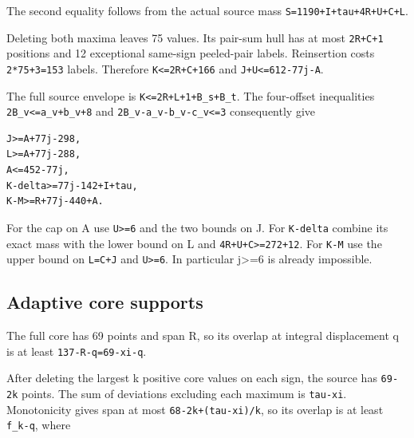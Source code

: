 \documentclass[10pt,a4paper]{article}
\theoremstyle{definition}
\begin{document}
The second equality follows from the actual source mass
\texttt{S=\allowbreak{}1190+\allowbreak{}I+\allowbreak{}tau+\allowbreak{}4R+\allowbreak{}U+\allowbreak{}C+\allowbreak{}L}.

Deleting both maxima leaves 75 values. Its pair-sum hull has at most
\texttt{2R+\allowbreak{}C+\allowbreak{}1} positions and 12 exceptional same-sign
peeled-pair labels. Reinsertion costs
\texttt{2*75+\allowbreak{}3=\allowbreak{}153} labels. Therefore
\texttt{K<=\allowbreak{}2R+\allowbreak{}C+\allowbreak{}166} and
\texttt{J+\allowbreak{}U<=\allowbreak{}612-77j-A}.

The full source envelope is
\texttt{K<=\allowbreak{}2R+\allowbreak{}L+\allowbreak{}1+\allowbreak{}B\_\allowbreak{}\allowbreak{}s+\allowbreak{}B\_\allowbreak{}\allowbreak{}t}. The four-offset
inequalities \texttt{2B\_\allowbreak{}\allowbreak{}v<=\allowbreak{}a\_\allowbreak{}\allowbreak{}v+\allowbreak{}b\_\allowbreak{}\allowbreak{}v+\allowbreak{}8} and
\texttt{2B\_\allowbreak{}\allowbreak{}v-a\_\allowbreak{}\allowbreak{}v-b\_\allowbreak{}\allowbreak{}v-c\_\allowbreak{}\allowbreak{}v<=\allowbreak{}3} consequently give

\begin{lstlisting}
J>=A+77j-298,
L>=A+77j-288,
A<=452-77j,
K-delta>=77j-142+I+tau,
K-M>=R+77j-440+A.
\end{lstlisting}

For the cap on A use \texttt{U>=\allowbreak{}6} and the two bounds
on J. For \texttt{K-delta} combine its exact mass with
the lower bound on L and \texttt{4R+\allowbreak{}U+\allowbreak{}C>=\allowbreak{}272+\allowbreak{}12}. For
\texttt{K-M} use the upper bound on
\texttt{L=\allowbreak{}C+\allowbreak{}J} and \texttt{U>=\allowbreak{}6}. In
particular j\textgreater=\allowbreak{}6 is already impossible.

\hypertarget{adaptive-core-supports}{%
\subsection{Adaptive core supports}\label{adaptive-core-supports}}

The full core has 69 points and span R,\allowbreak{} so its overlap at integral
displacement q is at least \texttt{137-R-q=\allowbreak{}69-xi-q}.

After deleting the largest k positive core values on each sign,\allowbreak{} the
source has \texttt{69-2k} points. The sum of deviations
excluding each maximum is \texttt{tau-xi}. Monotonicity
gives span at most \texttt{68-2k+\allowbreak{}(tau-xi)/\allowbreak{}k},\allowbreak{} so its
overlap is at least \texttt{f\_\allowbreak{}\allowbreak{}k-q},\allowbreak{} where
\end{document}
